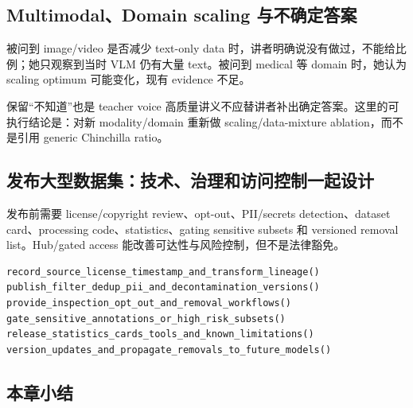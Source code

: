 \documentclass[a4paper]{article}
\begin{document}

\subsection{Multimodal、Domain scaling 与不确定答案}

被问到 image/video 是否减少 text-only data 时，讲者明确说没有做过，不能给比例；她只观察到当时 VLM 仍有大量 text。被问到 medical 等 domain 时，她认为 scaling optimum 可能变化，现有 evidence 不足。

\begin{importantbox}{保留“不知道”也是 teacher voice}
高质量讲义不应替讲者补出确定答案。这里的可执行结论是：对新 modality/domain 重新做 scaling/data-mixture ablation，而不是引用 generic Chinchilla ratio。
\end{importantbox}


\subsection{发布大型数据集：技术、治理和访问控制一起设计}

发布前需要 license/copyright review、opt-out、PII/secrets detection、dataset card、processing code、statistics、gating sensitive subsets 和 versioned removal list。Hub/gated access 能改善可达性与风险控制，但不是法律豁免。

\begin{lstlisting}[caption={大型训练数据集发布前 checklist}]
record_source_license_timestamp_and_transform_lineage()
publish_filter_dedup_pii_and_decontamination_versions()
provide_inspection_opt_out_and_removal_workflows()
gate_sensitive_annotations_or_high_risk_subsets()
release_statistics_cards_tools_and_known_limitations()
version_updates_and_propagate_removals_to_future_models()
\end{lstlisting}


\subsection{本章小结}
\end{document}
